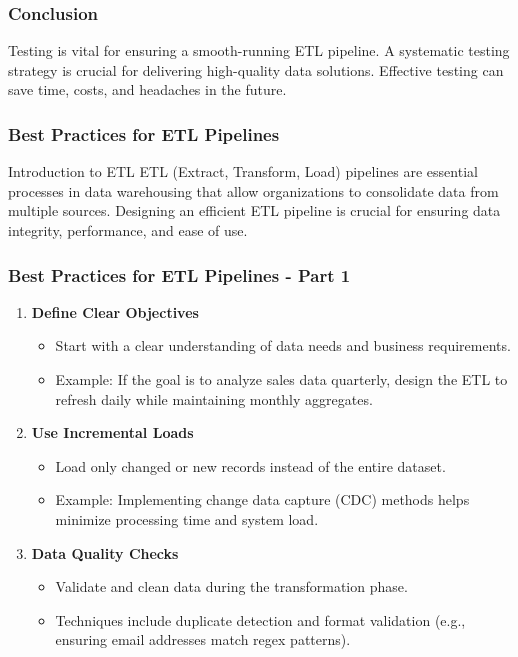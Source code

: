 \documentclass[aspectratio=169]{beamer}
\begin{document}
\begin{frame}
    \frametitle{Conclusion}
    
    Testing is vital for ensuring a smooth-running ETL pipeline. A systematic testing strategy is crucial for delivering high-quality data solutions. Effective testing can save time, costs, and headaches in the future.
\end{frame}

\begin{frame}
    \frametitle{Best Practices for ETL Pipelines}
    \begin{block}{Introduction to ETL}
        ETL (Extract, Transform, Load) pipelines are essential processes in data warehousing that allow organizations to consolidate data from multiple sources. Designing an efficient ETL pipeline is crucial for ensuring data integrity, performance, and ease of use.
    \end{block}
\end{frame}

\begin{frame}
    \frametitle{Best Practices for ETL Pipelines - Part 1}
    \begin{enumerate}
        \item \textbf{Define Clear Objectives}
        \begin{itemize}
            \item Start with a clear understanding of data needs and business requirements.
            \item Example: If the goal is to analyze sales data quarterly, design the ETL to refresh daily while maintaining monthly aggregates.
        \end{itemize}

        \item \textbf{Use Incremental Loads}
        \begin{itemize}
            \item Load only changed or new records instead of the entire dataset.
            \item Example: Implementing change data capture (CDC) methods helps minimize processing time and system load.
        \end{itemize}

        \item \textbf{Data Quality Checks}
        \begin{itemize}
            \item Validate and clean data during the transformation phase.
            \item Techniques include duplicate detection and format validation (e.g., ensuring email addresses match regex patterns).
        \end{itemize}
    \end{enumerate}
\end{frame}
\end{document}
